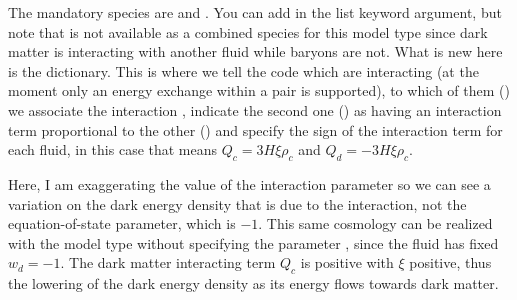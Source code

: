 \documentclass[letterpaper,12pt,english]{sphinxhowto}
\begin{document}
The mandatory species are  and . You can add 
in the  list keyword argument, but note that
 is not available as a combined species for this model type
since dark matter is interacting with another fluid while baryons are
not. What is new here is the  dictionary. This is
where we tell the code which  are interacting (at the moment
only an energy exchange within a pair is supported), to which of them
() we associate the interaction  , indicate
the second one () as having an interaction term proportional to
the other () and specify the sign of the interaction term for
each fluid, in this case that means \(Q_c = 3 H \xi \rho_c\) and
\(Q_d = - 3 H \xi \rho_c\).

%
\begin{sphinxVerbatim}[commandchars=\\\{\}]
         
 
\end{sphinxVerbatim}

\noindent{}

Here, I am exaggerating the value of the interaction parameter so we can
see a variation on the dark energy density that is due to the
interaction, not the equation-of-state parameter, which is \(-1\).
This same cosmology can be realized with the model type 
without specifying the parameter , since the  fluid has
fixed \(w_d = -1\). The dark matter interacting term \(Q_c\) is
positive with \(\xi\) positive, thus the lowering of the dark energy
density as its energy flows towards dark matter.
\end{document}
